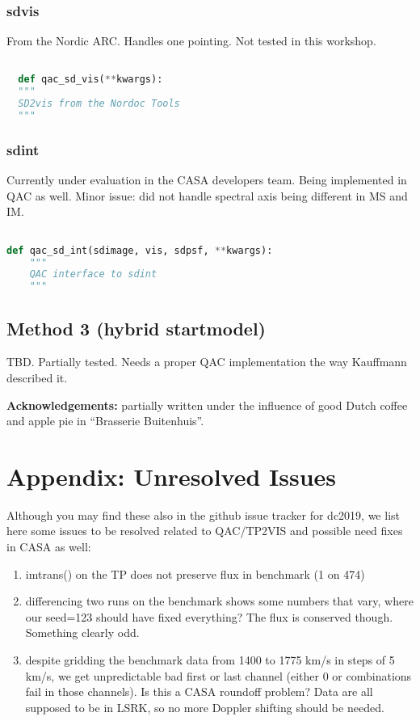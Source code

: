\documentclass[12pt,a4paper]{article}
\begin{document}
\subsubsection{sdvis}

From the Nordic ARC. Handles one pointing. Not tested in this workshop.

\begin{lstlisting}[language=Python]

  def qac_sd_vis(**kwargs):
  """
  SD2vis from the Nordoc Tools
  """

\end{lstlisting}


\subsubsection{sdint}

Currently under evaluation in the CASA developers team.  Being implemented in QAC as well.
Minor issue: did not handle spectral axis being different in MS and IM.

\begin{lstlisting}[language=Python]

def qac_sd_int(sdimage, vis, sdpsf, **kwargs):
    """
    QAC interface to sdint
    """


\end{lstlisting}


\subsection{Method 3 (hybrid startmodel)}

TBD. Partially tested. Needs a proper QAC implementation the way Kauffmann described it.

\bigskip
{\bf Acknowledgements:} partially written under the influence of good Dutch coffee and apple pie in ``Brasserie Buitenhuis''.

\clearpage
\section{Appendix: Unresolved Issues}

Although you may find these also in the github issue tracker for dc2019, we list here some issues to be resolved related to QAC/TP2VIS
and possible need fixes in CASA as well:

\begin{enumerate}

\item imtrans() on the TP does not preserve flux in benchmark (1 on 474)
\item differencing two runs on the benchmark shows some numbers that vary, where our seed=123 should have fixed everything?
  The flux is conserved though. Something clearly odd.
\item despite gridding the benchmark data from 1400 to 1775 km/s in steps of 5 km/s, we get unpredictable bad first or last channel
  (either 0 or combinations fail in those channels). Is this a CASA roundoff problem?  Data are all supposed to be in LSRK, so no more
  Doppler shifting should be needed.
  
  


\end{enumerate}
\end{document}
